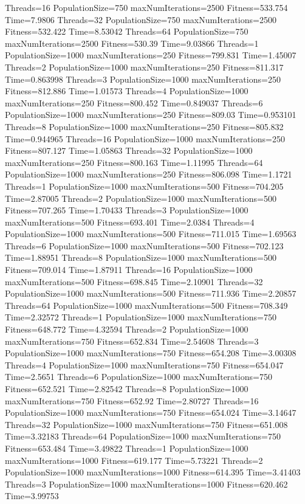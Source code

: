 \documentclass[10pt,letterpaper]{article}
\begin{document}
Threads=16 PopulationSize=750 maxNumIterations=2500 Fitness=533.754 Time=7.9806
Threads=32 PopulationSize=750 maxNumIterations=2500 Fitness=532.422 Time=8.53042
Threads=64 PopulationSize=750 maxNumIterations=2500 Fitness=530.39 Time=9.03866
Threads=1 PopulationSize=1000 maxNumIterations=250 Fitness=799.831 Time=1.45007
Threads=2 PopulationSize=1000 maxNumIterations=250 Fitness=811.317 Time=0.863998
Threads=3 PopulationSize=1000 maxNumIterations=250 Fitness=812.886 Time=1.01573
Threads=4 PopulationSize=1000 maxNumIterations=250 Fitness=800.452 Time=0.849037
Threads=6 PopulationSize=1000 maxNumIterations=250 Fitness=809.03 Time=0.953101
Threads=8 PopulationSize=1000 maxNumIterations=250 Fitness=805.832 Time=0.944965
Threads=16 PopulationSize=1000 maxNumIterations=250 Fitness=807.127 Time=1.05863
Threads=32 PopulationSize=1000 maxNumIterations=250 Fitness=800.163 Time=1.11995
Threads=64 PopulationSize=1000 maxNumIterations=250 Fitness=806.098 Time=1.1721
Threads=1 PopulationSize=1000 maxNumIterations=500 Fitness=704.205 Time=2.87005
Threads=2 PopulationSize=1000 maxNumIterations=500 Fitness=707.265 Time=1.70433
Threads=3 PopulationSize=1000 maxNumIterations=500 Fitness=693.401 Time=2.0384
Threads=4 PopulationSize=1000 maxNumIterations=500 Fitness=711.015 Time=1.69563
Threads=6 PopulationSize=1000 maxNumIterations=500 Fitness=702.123 Time=1.88951
Threads=8 PopulationSize=1000 maxNumIterations=500 Fitness=709.014 Time=1.87911
Threads=16 PopulationSize=1000 maxNumIterations=500 Fitness=698.845 Time=2.10901
Threads=32 PopulationSize=1000 maxNumIterations=500 Fitness=711.936 Time=2.20857
Threads=64 PopulationSize=1000 maxNumIterations=500 Fitness=708.349 Time=2.32572
Threads=1 PopulationSize=1000 maxNumIterations=750 Fitness=648.772 Time=4.32594
Threads=2 PopulationSize=1000 maxNumIterations=750 Fitness=652.834 Time=2.54608
Threads=3 PopulationSize=1000 maxNumIterations=750 Fitness=654.208 Time=3.00308
Threads=4 PopulationSize=1000 maxNumIterations=750 Fitness=654.047 Time=2.5651
Threads=6 PopulationSize=1000 maxNumIterations=750 Fitness=652.521 Time=2.82542
Threads=8 PopulationSize=1000 maxNumIterations=750 Fitness=652.92 Time=2.80727
Threads=16 PopulationSize=1000 maxNumIterations=750 Fitness=654.024 Time=3.14647
Threads=32 PopulationSize=1000 maxNumIterations=750 Fitness=651.008 Time=3.32183
Threads=64 PopulationSize=1000 maxNumIterations=750 Fitness=653.484 Time=3.49822
Threads=1 PopulationSize=1000 maxNumIterations=1000 Fitness=619.177 Time=5.73221
Threads=2 PopulationSize=1000 maxNumIterations=1000 Fitness=614.395 Time=3.41403
Threads=3 PopulationSize=1000 maxNumIterations=1000 Fitness=620.462 Time=3.99753
\end{document}

